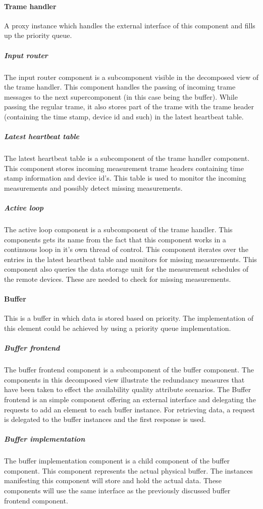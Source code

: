 \paragraph{Trame handler}
A proxy instance which handles the external interface of this component and fills up the priority queue. 
\subparagraph{Input router}
The input router component is a subcomponent visible in the decomposed view of the trame handler. 
This component handles the passing of incoming trame messages to the next supercomponent (in this case
being the buffer). While passing the regular trame, it also stores part of the trame with the trame 
header (containing the time stamp, device id and such) in the latest heartbeat table.
\subparagraph{Latest heartbeat table}
The latest heartbeat table is a subcomponent of the trame handler component. This component stores
incoming measurement trame headers containing time stamp information and device id's. This table
is used to monitor the incoming measurements and possibly detect missing measurements. 
\subparagraph{Active loop}
The active loop component is a subcomponent of the trame handler. This components gets its name from the fact that this component works in a continuous loop in it's own thread of control. This component
iterates over the entries in the latest heartbeat table and monitors for missing measurements.
This component also queries the data storage unit for the measurement schedules of the remote devices.
These are needed to check for missing measurements. 
\paragraph{Buffer} 
This is a buffer in which data is stored based on priority. The implementation of this element could be achieved by using a priority queue implementation.
\subparagraph{Buffer frontend}
The buffer frontend component is a subcomponent of the buffer component. The components in this decomposed view illustrate the redundancy measures that have been taken to effect the availability quality attribute scenarios. The Buffer frontend is an simple component offering an external interface and delegating the requests to add an element to each buffer instance. For retrieving data, a request is delegated to the buffer instances and the first response is used. 
\subparagraph{Buffer implementation}
The buffer implementation component is a child component of the buffer component. This component represents the actual physical buffer. The instances manifesting this component will store and hold the actual data. These components will use the same interface as the previously discussed buffer frontend component.
